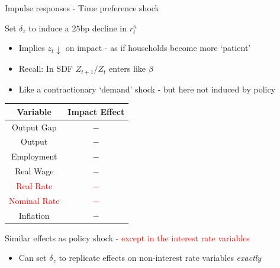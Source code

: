 \documentclass{beamer}
\begin{document}
\begin{frame}{Impulse responses - Time preference shock}

Set $\delta_{z}$ to induce a $25$bp decline in $r^{n}_{t}$
\begin{itemize}
\item	Implies $z_{t}\downarrow$ on impact - as if households become more `patient'
\item	Recall: In SDF $Z_{t+1}/Z_{t}$ enters like $\beta$
\item	Like a contractionary `demand' shock - but here not induced by policy
\end{itemize}
\begin{table}
\begin{tabular}{ c | c }
\textbf{Variable} 	& \textbf{Impact Effect}	\\ \hline \hline
  Output Gap			& $-$				\\
  Output				& $-$				\\
  Employment		& $-$				\\
  Real Wage			& $-$				\\
 \textcolor{red}{Real Rate}			& \textcolor{red}{$-$}				\\
  \textcolor{red}{Nominal Rate}		& \textcolor{red}{$-$}				\\
  Inflation			& $-$				\\ \hline \hline
\end{tabular}
\end{table}

Similar effects as policy shock - \textcolor{red}{except in the interest rate variables}
\begin{itemize}
\item	Can set $\delta_{z}$ to replicate effects on non-interest rate variables \emph{exactly}
\end{itemize}

\end{frame}


\end{document}
